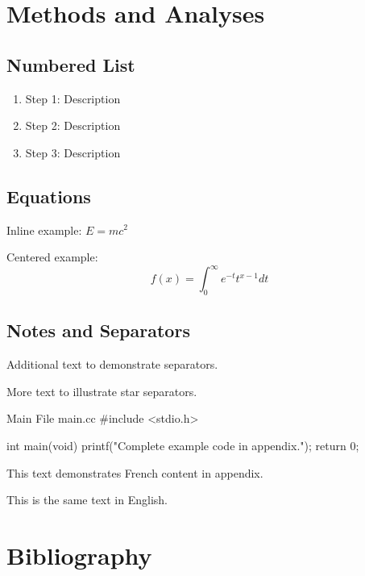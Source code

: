 \documentclass[11pt]{custom-report}
\begin{document}
\section{Methods and Analyses}

\subsection{Numbered List}

\begin{enumerate}
    \item Step 1: Description
    \item Step 2: Description
    \item Step 3: Description
\end{enumerate}

\subsection{Equations}

Inline example: \(E=mc^2\)  

Centered example:
\[
f(x) = \int_0^\infty e^{-t} t^{x-1} dt
\]

\subsection{Notes and Separators}
\sepline

Additional text to demonstrate separators.

\sepstars

More text to illustrate star separators.

\clearemptydoublepage
\appendix

\begin{code}{Main File main.c}{c}
#include <stdio.h>

int main(void) {
    printf("Complete example code in appendix.\n");
    return 0;
}
\end{code}

\lipsum[1-3]

This text demonstrates French content in appendix.

This is the same text in English.

\listofappendices

\clearemptydoublepage
{}
\section*{Bibliography}

\nocite{*} %

\end{document}
